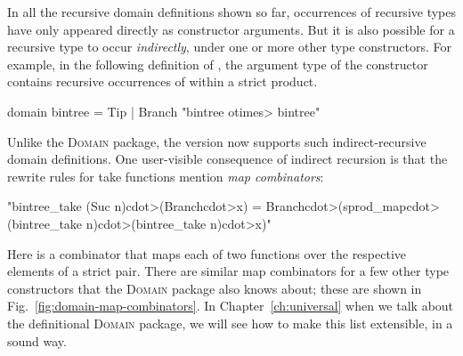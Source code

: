 In all the recursive domain definitions shown so far, occurrences of recursive types have only appeared directly as constructor arguments. But it is also possible for a recursive type to occur \emph{indirectly}, under one or more other type constructors. For example, in the following definition of , the argument type of the  constructor contains recursive occurrences of  within a strict product.
%
\begin{isacode}
domain bintree = Tip | Branch "bintree \<otimes> bintree"
\end{isacode}
%
Unlike the  \textsc{Domain} package, the  version now supports such indirect-recursive domain definitions. One user-visible consequence of indirect recursion is that the rewrite rules for take functions mention \emph{map combinators}:
%
\begin{isacode}
"bintree_take (Suc n)\<cdot>(Branch\<cdot>x) =
  Branch\<cdot>(sprod_map\<cdot>(bintree_take n)\<cdot>(bintree_take n)\<cdot>x)"
\end{isacode}
%
Here  is a combinator that maps each of two functions over the respective elements of a strict pair. There are similar map combinators for a few other type constructors that the \textsc{Domain} package also knows about; these are shown in Fig.~\ref{fig:domain-map-combinators}. In Chapter~\ref{ch:universal} when we talk about the definitional \textsc{Domain} package, we will see how to make this list extensible, in a sound way.

